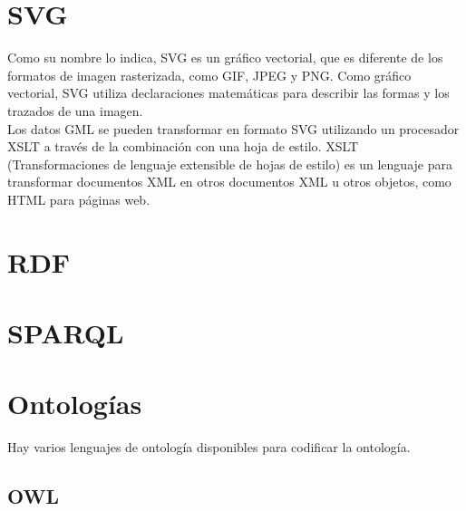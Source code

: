 \section{SVG}

Como su nombre lo indica, SVG es un gráfico vectorial, que es diferente de los formatos de imagen rasterizada, como GIF, JPEG y PNG. Como gráfico vectorial, SVG utiliza declaraciones matemáticas para describir las formas y los trazados de una imagen.\\


Los datos GML se pueden transformar en formato SVG utilizando un procesador XSLT a través de la combinación con una hoja de estilo. XSLT (Transformaciones de lenguaje extensible de hojas de estilo) es un lenguaje para transformar documentos XML en otros documentos XML u otros objetos, como HTML para páginas web.


\section{RDF}

\section{SPARQL}

\section{Ontologías}







Hay varios lenguajes de ontología disponibles para codificar la ontología.

\subsection{OWL}







